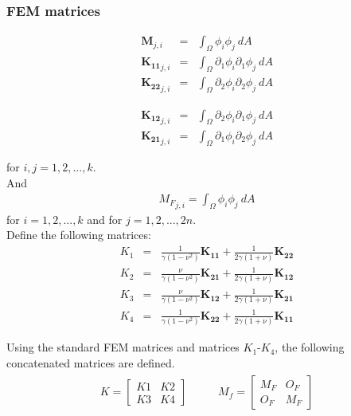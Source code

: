 \documentclass[../../main.tex]{subfiles}
\begin{document}
\subsubsection{FEM matrices}
\noindent\begin{minipage}{.5\linewidth}
	\begin{eqnarray*}
		\mathbf{M}_{j,i} & = & \int_{\Omega} \phi_i \phi_j ~dA \\
		\mathbf{{K}_{11}}_{j,i} & = & \int_{\Omega} \partial_1\phi_i \partial_1\phi_j~dA\\
		\mathbf{{K}_{22}}_{j,i} & = & \int_{\Omega} \partial_2\phi_i \partial_2\phi_j~dA
	\end{eqnarray*}
\end{minipage}%
\begin{minipage}{.5\linewidth}
	\begin{eqnarray*}
		\mathbf{{K}_{12}}_{j,i} & = & \int_{\Omega} \partial_2\phi_i \partial_1\phi_j~dA\\
		\mathbf{{K}_{21}}_{j,i} & = & \int_{\Omega} \partial_1\phi_i \partial_2\phi_j~dA
	\end{eqnarray*}
\end{minipage}
for $i,j = 1,2,...,k$.\\

And 
\begin{eqnarray*}
	{M_{F}}_{j,i} = \int_{\Omega}  \phi_i \phi_j~dA
\end{eqnarray*} for $i = 1,2,...,k$ and for $j =1,2,...,2n$.\\

Define the following matrices:
\begin{eqnarray*}
	K_1 & = & \frac{1}{\gamma(1-\nu^2)} \mathbf{K_{11}} + \frac{1}{2\gamma(1+\nu)}\mathbf{K_{22}} \label{eq:2DFEM:K1} \\
	K_2 & = & \frac{\nu}{\gamma(1-\nu^2)} \mathbf{K_{21}} + \frac{1}{2\gamma(1+\nu)}\mathbf{K_{12}}\label{eq:2DFEM:K2}\\
	K_3 & = & \frac{\nu}{\gamma(1-\nu^2)} \mathbf{K_{12}} + \frac{1}{2\gamma(1+\nu)}\mathbf{K_{21}}\label{eq:2DFEM:K3}\\
	K_4 & = & \frac{1}{\gamma(1-\nu^2)} \mathbf{K_{22}} + \frac{1}{2\gamma(1+\nu)}\mathbf{K_{11}}\label{eq:2DFEM:K4}
\end{eqnarray*}

Using the standard FEM matrices and matrices $K_1$-$K_4$, the following concatenated matrices are defined.
\begin{eqnarray}
	\begin{aligned}
		K = 
		\begin{bmatrix}
			K1 & K2\\
			K3 & K4
		\end{bmatrix}
	\end{aligned}
	\ \ \ \ \ \ \ \ \
	\begin{aligned}
		M_f = 
		\begin{bmatrix}
			M_{F} & O_{F}\\
			O_{F} & M_{F}
		\end{bmatrix}
	\end{aligned}\label{eq:2DFEM:K+M}
\end{eqnarray}
\end{document}
